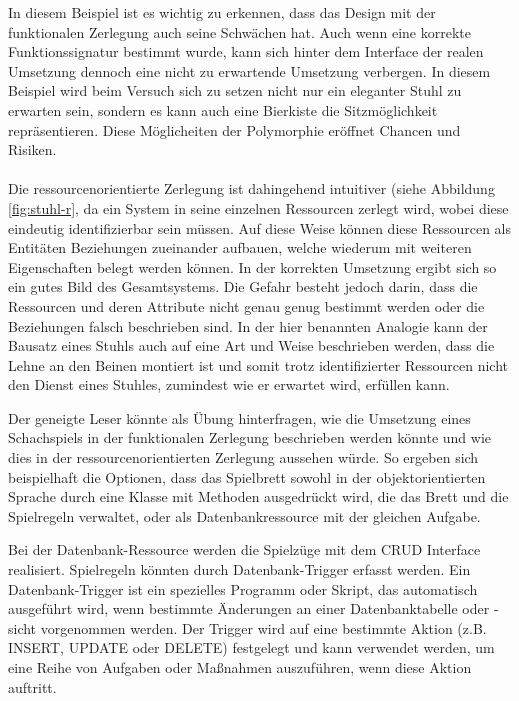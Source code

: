 In diesem Beispiel ist es wichtig zu erkennen, dass das Design mit der funktionalen Zerlegung auch seine Schwächen hat. Auch wenn eine korrekte Funktionssignatur bestimmt wurde, kann sich hinter dem Interface der realen Umsetzung dennoch eine nicht zu erwartende Umsetzung verbergen. In diesem  Beispiel wird beim Versuch sich zu setzen nicht nur ein eleganter Stuhl zu erwarten sein, sondern es kann auch eine Bierkiste die Sitzmöglichkeit repräsentieren. Diese Möglicheiten der Polymorphie eröffnet Chancen und Risiken.  
\\\\
Die ressourcenorientierte Zerlegung ist dahingehend intuitiver (siehe Abbildung \ref{fig:stuhl-r}, da ein System in seine einzelnen Ressourcen zerlegt wird, wobei diese eindeutig identifizierbar sein müssen. Auf diese Weise können diese Ressourcen als Entitäten Beziehungen zueinander aufbauen, welche wiederum mit weiteren Eigenschaften belegt werden können. In der korrekten Umsetzung ergibt sich so ein gutes Bild des Gesamtsystems. Die Gefahr besteht jedoch darin, dass die Ressourcen und deren Attribute nicht genau genug bestimmt werden oder die Beziehungen falsch beschrieben sind. In der hier benannten Analogie kann der Bausatz eines Stuhls auch auf eine Art und Weise beschrieben werden, dass die Lehne an den Beinen montiert ist und somit trotz identifizierter Ressourcen nicht den Dienst eines Stuhles, zumindest wie er erwartet wird, erfüllen kann.

Der geneigte Leser könnte als Übung hinterfragen, wie die Umsetzung eines Schachspiels in der funktionalen Zerlegung beschrieben werden könnte und wie dies in der ressourcenorientierten Zerlegung aussehen würde. So ergeben sich beispielhaft die Optionen, dass das Spielbrett sowohl in der objektorientierten Sprache durch eine Klasse mit Methoden ausgedrückt wird, die das Brett und die Spielregeln verwaltet, oder als Datenbankressource mit der gleichen Aufgabe.

Bei der Datenbank-Ressource werden die Spielzüge mit dem CRUD Interface realisiert. Spielregeln könnten durch Datenbank-Trigger erfasst werden. Ein Datenbank-Trigger ist ein spezielles Programm oder Skript, das  automatisch ausgeführt wird, wenn bestimmte Änderungen an einer Datenbanktabelle oder -sicht vorgenommen werden. Der Trigger wird auf eine bestimmte Aktion (z.B. INSERT, UPDATE oder DELETE) festgelegt und kann verwendet werden, um eine Reihe von Aufgaben oder Maßnahmen auszuführen, wenn diese Aktion auftritt.


